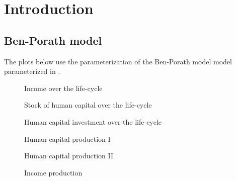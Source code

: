 \section{Introduction}
\FloatBarrier\subsection{Ben-Porath model}

The plots below use the parameterization of the Ben-Porath model \citep{Ben-Porath.1967} model parameterized in \citet{Cahuc.2014}.

\begin{figure}[htp]\centering
\caption{Income over the life-cycle}\label{Income over the life-cycle}
\end{figure}

\begin{figure}[htp]\centering
\caption{Stock of human capital over the life-cycle}
\label{Stock of human capital over the life-cycle}
\end{figure}

\begin{figure}[htp]\centering
\caption{Human capital investment over the life-cycle}
\label{Human capital investment over the life-cycle}
\end{figure}

\begin{figure}[htp]\centering
\caption{Human capital production I}\label{Human capital production I}
\end{figure}

\begin{figure}[htp]\centering
\caption{Human capital production II}\label{Human capital production II}
\end{figure}

\begin{figure}[htp]\centering
\caption{Income production}\label{Income production}
\end{figure}
